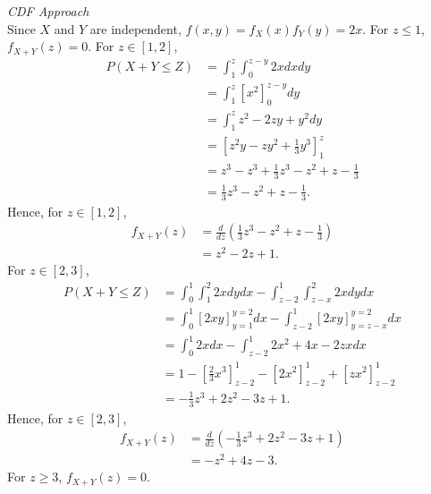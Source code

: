 \documentclass{article}
\begin{document}
\emph{CDF Approach}\\
Since $X$ and $Y$ are independent, $f(x,y)=f_X(x)f_Y(y)=2x$. For $z \le 1$, $f_{X+Y}(z)=0$. For $z \in [1,2]$, 
\begin{align}
    P(X+Y \le Z) & = \int_{1}^{z}\int_{0}^{z-y}2xdxdy \\
    & = \int_{1}^{z}\left[x^2\right]_0^{z-y}dy \\
    & = \int_{1}^{z}z^2-2zy+y^2dy \\
    & = \left[z^2y-zy^2+\frac{1}{3}y^3\right]_1^z \\
    & = z^3-z^3+\frac{1}{3}z^3-z^2+z-\frac{1}{3} \\
    & = \frac{1}{3}z^3-z^2+z-\frac{1}{3}.
\end{align}
Hence, for $z \in [1,2]$,
\begin{align}
    f_{X+Y}(z)&=\frac{d}{dz}\left(\frac{1}{3}z^3-z^2+z-\frac{1}{3}\right) \\
    & = z^2-2z+1.
\end{align}
For $z \in [2,3]$,
\begin{align}
    P(X+Y\le Z) & = \int_{0}^{1}\int_{1}^{2}2xdydx - \int_{z-2}^{1}\int_{z-x}^{2}2xdydx \\
    & = \int_{0}^{1}\left[2xy\right]_{y=1}^{y=2}dx - \int_{z-2}^{1}\left[2xy\right]_{y=z-x}^{y=2}dx \\
    & = \int_{0}^{1}2xdx-\int_{z-2}^{1}2x^2+4x-2zxdx \\
    & = 1 - \left[\frac{2}{3}x^3\right]_{z-2}^1 - \left[2x^2\right]_{z-2}^1 + \left[zx^2\right]_{z-2}^1 \\
    & = -\frac{1}{3}z^3+2z^2-3z+1.
\end{align}
Hence, for $z\in [2,3]$,
\begin{align}
    f_{X+Y}(z)&=\frac{d}{dz}\left(-\frac{1}{3}z^3+2z^2-3z+1\right) \\
    & = -z^2+4z-3.
\end{align}
For $z\ge 3$, $f_{X+Y}(z)=0$.
\end{document}
